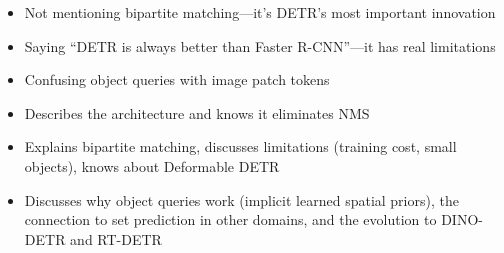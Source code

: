 \begin{interviewq}
\redflags
\begin{itemize}
    \item Not mentioning bipartite matching---it's DETR's most important innovation
    \item Saying ``DETR is always better than Faster R-CNN''---it has real limitations
    \item Confusing object queries with image patch tokens
\end{itemize}


\goodgreat
\begin{itemize}
    \item {} Describes the architecture and knows it eliminates NMS
    \item {} Explains bipartite matching, discusses limitations (training cost, small objects), knows about Deformable DETR
    \item {} Discusses why object queries work (implicit learned spatial priors), the connection to set prediction in other domains, and the evolution to DINO-DETR and RT-DETR
\end{itemize}

\end{interviewq}

